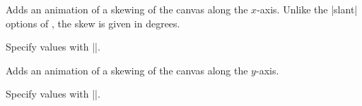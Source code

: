 \begin{command}{\pgfsys@animateskewx}
  Adds an animation of a skewing of the canvas along the
  $x$-axis. Unlike the |slant| options of \tikzname, the skew is given
  in degrees.
  
  Specify values with |\pgfsys@animation@scalar|.
\begin{codeexample}[width=2cm]
\end{codeexample}
\end{command}

\begin{command}{\pgfsys@animateskewy}
  Adds an animation of a skewing of the canvas along the $y$-axis.
  
  Specify values with |\pgfsys@animation@scalar|.
\end{command}


